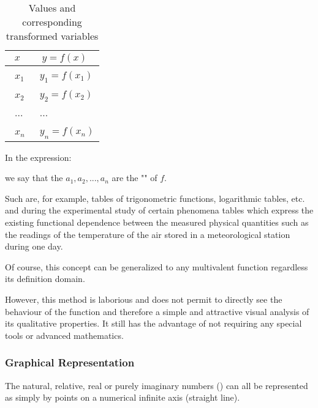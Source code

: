 	\begin{table}[H]
	\begin{center}
			\begin{tabular}{|p{2cm}|p{2.5cm}|}
				\hline
				\multicolumn{1}{c}{\cellcolor{black!30}\textbf{$x$}} & 
  \multicolumn{1}{c}{\cellcolor{black!30}\textbf{$y=f(x)$}} \\ \hline
				\centering\arraybackslash\ $x_1$ & \centering\arraybackslash\ $y_1=f(x_1)$ \\ \hline
				\centering\arraybackslash\ $x_2$ & \centering\arraybackslash\ $y_2=f(x_2)$  \\ \hline
				\centering\arraybackslash\ $...$ & \centering\arraybackslash\ $...$  \\ \hline
				\centering\arraybackslash\ $x_n$ & \centering\arraybackslash\ $y_n=f(x_n)$  \\ \hline
		\end{tabular}
	\end{center}
	\caption[]{Values and corresponding transformed variables}
	\end{table}	
	
	In the expression:
	
	we say that the $a_1,a_2,...,a_n$ are the "" of $f$.

Such are, for example, tables of trigonometric functions, logarithmic tables, etc. and during the experimental study of certain phenomena tables which express the existing functional dependence between the measured physical quantities such as the readings of the temperature of the air stored in a meteorological station during one day.

Of course, this concept can be generalized to any multivalent function regardless its definition domain.

However, this method is laborious and does not permit to directly see the behaviour of the function and therefore a simple and attractive visual analysis of its qualitative properties. It still has the advantage of not requiring any special tools or advanced mathematics.

	\pagebreak
	\subsubsection{Graphical Representation}
	The natural, relative, real or purely imaginary numbers  () can all be represented as simply by points on a numerical infinite axis (straight line).


